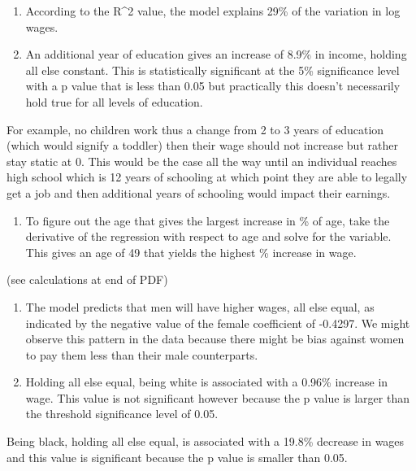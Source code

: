 \documentclass[
  letterpaper,
  DIV=11,
  numbers=noendperiod]{scrartcl}
\providecommand{\tightlist}{%
  \setlength{\itemsep}{0pt}\setlength{\parskip}{0pt}}\usepackage{longtable,booktabs,array}
\begin{document}
\begin{enumerate}
\def\labelenumi{\alph{enumi}.}
\item
  According to the R\^{}2 value, the model explains 29\% of the
  variation in log wages.
\item
  An additional year of education gives an increase of 8.9\% in income,
  holding all else constant. This is statistically significant at the
  5\% significance level with a p value that is less than 0.05 but
  practically this doesn't necessarily hold true for all levels of
  education.
\end{enumerate}

For example, no children work thus a change from 2 to 3 years of
education (which would signify a toddler) then their wage should not
increase but rather stay static at 0. This would be the case all the way
until an individual reaches high school which is 12 years of schooling
at which point they are able to legally get a job and then additional
years of schooling would impact their earnings.

\begin{enumerate}
\def\labelenumi{\alph{enumi}.}
\setcounter{enumi}{2}
\tightlist
\item
  To figure out the age that gives the largest increase in \% of age,
  take the derivative of the regression with respect to age and solve
  for the variable. This gives an age of 49 that yields the highest \%
  increase in wage.
\end{enumerate}

(see calculations at end of PDF)

\begin{enumerate}
\def\labelenumi{\alph{enumi}.}
\setcounter{enumi}{3}
\item
  The model predicts that men will have higher wages, all else equal, as
  indicated by the negative value of the female coefficient of -0.4297.
  We might observe this pattern in the data because there might be bias
  against women to pay them less than their male counterparts.
\item
  Holding all else equal, being white is associated with a 0.96\%
  increase in wage. This value is not significant however because the p
  value is larger than the threshold significance level of 0.05.
\end{enumerate}

Being black, holding all else equal, is associated with a 19.8\%
decrease in wages and this value is significant because the p value is
smaller than 0.05.
\end{document}
